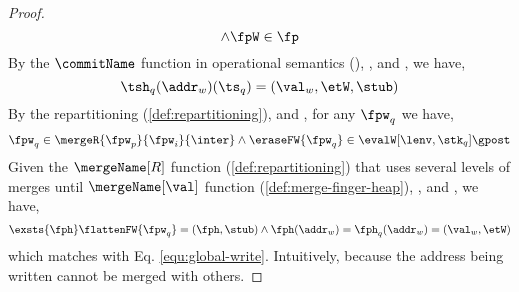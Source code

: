 \begin{proof}
\begin{equation}
    \land \fpW \in \fp
\end{equation}
By the \( \commitName \) function in operational semantics (), ,  and , we have,
\begin{equation}
    \label{equ:global-write}
    \tsh_{q}(\addr_{w})(\ts_{q}) = (\val_{w}, \etW, \stub)
\end{equation}
By the repartitioning ( \ref{def:repartitioning}),  and , for any \( \fpw_{q} \) we have,
\begin{equation}
    \label{equ:repartition}
    \fpw_{q} \in \mergeR{\fpw_{p}}{\fpw_{i}}{\inter} \land \eraseFW{\fpw_{q}} \in \evalW[\lenv, \stk_{q}]{\gpost}
\end{equation}
Given the \( \mergeName[R] \) function ( \ref{def:repartitioning}) that uses several levels of merges until \( \mergeName[\val] \) function ( \ref{def:merge-finger-heap}), ,  and , we have,
\begin{equation}
    \label{equ:write-remain-the-same}
    \exsts{\fph} \flattenFW{\fpw_{q}} = (\fph, \stub) \land \fph(\addr_{w}) = \fph_{q}(\addr_{w}) = (\val_{w}, \etW)
\end{equation}
which matches with Eq. \eqref{equ:global-write}.
Intuitively, because the address being written cannot be merged with others.


\end{proof}
